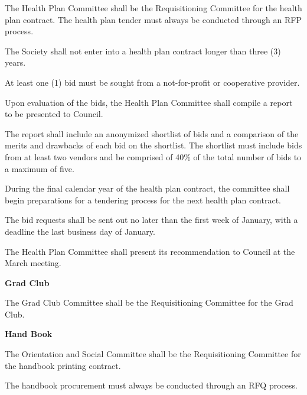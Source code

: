 \begin{longenum}[label*=\thesection.\arabic*., align=left]
\begin{longenum} [label*=\arabic*., align=left]
		\begin{longenum} [label*=\arabic*., align=left]
			\item The Health Plan Committee shall be the Requisitioning Committee for the health plan contract. The health plan tender must always be conducted through an RFP process.
		\item 	The Society shall not enter into a health plan contract longer than three (3) years.
		\item 	At least one (1) bid must be sought from a not-for-profit or cooperative provider.
		\item Upon evaluation of the bids, the Health Plan Committee shall compile a report to be presented to Council.
		\item The  report  shall  include  an  anonymized  shortlist  of  bids  and  a  comparison  of  the  merits  and  drawbacks  of  each  bid  on  the  shortlist.  The  shortlist  must  include  bids  from  at  least  two  vendors  and  be  comprised  of  40\%  of  the  total  number  of  bids  to  a  maximum  of  five.
		\item During the final calendar year of the health plan contract, the committee shall begin preparations for a tendering process for the next health plan contract.
		\item 	The bid requests shall be sent out no later than the first week of January, with a deadline the last business day of January.
		\item 	The Health Plan Committee shall present its recommendation to Council at the
March meeting.
	\end{longenum}	
	
\item \textbf{Grad Club}

\begin{longenum} [label*=\arabic*., align=left]
	\item The Grad Club Committee shall be the Requisitioning Committee for the Grad Club.
\end{longenum}	

\item \textbf{Hand Book}
\begin{longenum} [label*=\arabic*., align=left]
	\item The Orientation and Social Committee shall be the Requisitioning Committee for the handbook printing contract.
	
	\item The handbook procurement must always be conducted through an RFQ process.
	

\end{longenum}
\end{longenum}
\end{longenum}
